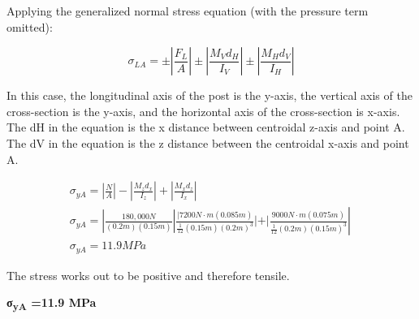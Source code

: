 \documentclass[
  letterpaper,
  DIV=11,
  numbers=noendperiod]{scrreprt}
\begin{document}
\begin{tcolorbox}
\begin{tcolorbox}
Applying the generalized normal stress equation (with the pressure term
omitted):

\[
\sigma_{L A}= \pm\left|\frac{F_L}{A}\right| \pm\left|\frac{M_V d_H}{I_V}\right| \pm\left|\frac{M_H d_V}{I_H}\right|
\]

In this case, the longitudinal axis of the post is the y-axis, the
vertical axis of the cross-section is the y-axis, and the horizontal
axis of the cross-section is x-axis. The dH in the equation is the x
distance between centroidal z-axis and point A. The dV in the equation
is the z distance between the centroidal x-axis and point A.

\[
\begin{gathered}
\sigma_{y A}=\left|\frac{N}{A}\right|-\left|\frac{M_z d_x}{I_z}\right|+\left|\frac{M_x d_z}{I_x}\right| \\
\left.\sigma_{y A}=\left|\frac{180,000 N}{(0.2 m)(0.15 m)}\right| \frac{\mid 7200 N \cdot m(0.085 m)}{\frac{1}{12}(0.15 m)(0.2 m)^3}|+| \frac{9000 N \cdot m(0.075 m)}{\frac{1}{12}(0.2 m)(0.15 m)^3} \right\rvert\, \\
\sigma_{y A}=11.9 M P a
\end{gathered}
\]

The stress works out to be positive and therefore tensile.

\textbf{σ\textsubscript{yA} =11.9 MPa}

\end{tcolorbox}

\end{tcolorbox}
\end{document}
